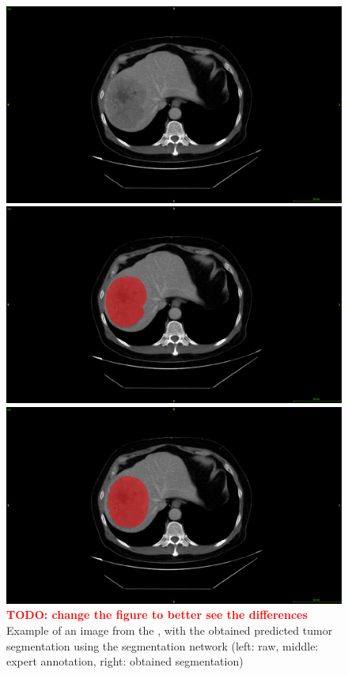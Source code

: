 \begin{figure}
\begin{minipage}{0.3\linewidth}
\includegraphics[width=\linewidth]{./images/image13.png}
\end{minipage}
\hspace{0.1cm}
\begin{minipage}{0.3\linewidth}
\includegraphics[width=\linewidth]{./images/image10.png}
\end{minipage}
\hspace{0.1cm}
\begin{minipage}{0.3\linewidth}
\includegraphics[width=\linewidth]{./images/image7.png}
\end{minipage}
\caption{\textcolor{red}{\textbf{TODO: change the figure to better see the differences}}
Example of an image from the , with the obtained predicted tumor
segmentation using the  segmentation network (left: raw,
middle: expert annotation, right: obtained segmentation)}
\label{fig:TCIAMultiphaseTumorPred}
\end{figure}


